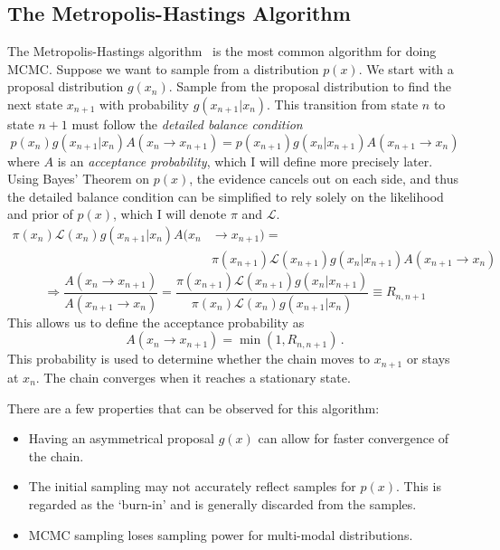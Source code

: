 \subsection{The Metropolis-Hastings Algorithm}
The Metropolis-Hastings algorithm~\cite{tobias_metropolis-hastings_nodate,zhao_bayesian_2021,helsby_monte_nodate} is the most common algorithm for doing MCMC. Suppose we want to sample from a distribution $p(x)$. We start with a proposal distribution $g(x_n)$. 
Sample from the proposal distribution to find the next state $x_{n+1}$ with probability $g(x_{n+1}|x_n)$. 
This transition from state $n$ to state $n+1$ must follow the \textit{detailed balance condition}
\begin{equation}
	p(x_n) g(x_{n+1}|x_n) A(x_n \rightarrow x_{n+1}) = p(x_{n+1}) g(x_n|x_{n+1}) A(x_{n+1} \rightarrow x_{n})
\end{equation}
where $A$ is an \textit{acceptance probability}, which I will define more precisely later. 
Using Bayes' Theorem on $p(x)$, the evidence cancels out on each side, 
and thus the detailed balance condition can be simplified to rely solely on the likelihood and prior of $p(x)$, 
which I will denote $\pi$ and $\mathcal{L}$.
\begin{equation}
	\begin{split}
		\pi(x_n)\mathcal{L}(x_n) g(x_{n+1}|x_n) A(x_n &\rightarrow x_{n+1}) = \\
		&\pi(x_{n+1}) \mathcal{L}(x_{n+1}) g(x_{n}|x_{n+1}) A(x_{n+1}\rightarrow x_{n})
	\end{split}
\end{equation}
\begin{equation}
	\Rightarrow \frac{A(x_n \rightarrow x_{n+1})}{A(x_{n+1}\rightarrow x_{n})} = \frac{\pi(x_{n+1}) \mathcal{L}(x_{n+1}) g(x_{n}|x_{n+1})}{\pi(x_n)\mathcal{L}(x_n) g(x_{n+1}|x_n)} \equiv R_{n,n+1}
\end{equation}
This allows us to define the acceptance probability as
\begin{equation}
	A(x_n \rightarrow x_{n+1}) = \min( 1, R_{n,n+1} )\,.
\end{equation}
This probability is used to determine whether the chain moves to $x_{n+1}$ or stays at $x_n$. The chain converges when it reaches a stationary state.

There are a few properties that can be observed for this algorithm:
\begin{itemize}
    \item Having an asymmetrical proposal $g(x)$ can allow for faster convergence of the chain.
    \item The initial sampling may not accurately reflect samples for $p(x)$. 
    This is regarded as the `burn-in' and is generally discarded from the samples.
    \item MCMC sampling loses sampling power for multi-modal distributions. 
\end{itemize}


